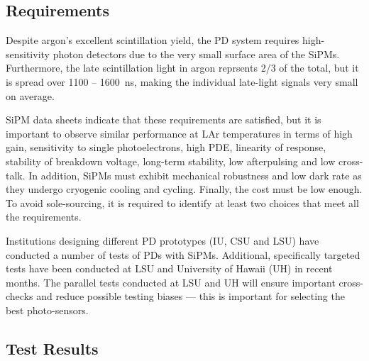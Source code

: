 
\subsection{Requirements}

Despite argon's excellent scintillation yield, the PD system requires high-sensitivity photon detectors %
due to
the very small surface area of the SiPMs. %
Furthermore, the late scintillation light in
argon reprsents 2/3 of the total, %
but it is spread
over 1100 -- 1600~ns, making the individual late-light signals very
small on average.


SiPM data sheets indicate that these requirements are satisfied, but
it is important to observe similar performance
at LAr temperatures in terms of high gain, sensitivity to
single photoelectrons, high PDE, linearity of response, stability
of breakdown voltage, long-term stability, low afterpulsing and low
cross-talk. In addition, SiPMs must exhibit mechanical
robustness and low dark rate as they undergo cryogenic cooling and cycling. Finally, the cost must be low enough. To avoid sole-sourcing, it is required
to identify at least two
choices that meet all the requirements. %

Institutions designing different PD prototypes (IU, CSU and LSU) %
have
conducted a number of tests of PDs with SiPMs.  Additional,
specifically targeted tests have been conducted at LSU and University of Hawaii (UH) in recent
months. %
The parallel tests conducted at LSU and
UH will ensure important cross-checks and reduce
possible testing biases --- this is important for selecting the best photo-sensors.

\subsection{Test Results}

